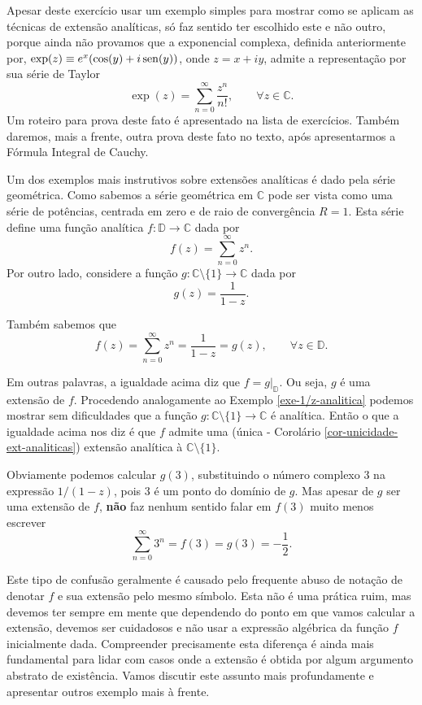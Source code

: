 \begin{exemplo}
\medskip 
\noindent
\begin{observacao}
Apesar deste exercício usar um exemplo simples para
mostrar como se aplicam as técnicas de extensão analíticas, 
só faz sentido ter escolhido este e não outro, 
porque ainda não provamos que a exponencial complexa, definida 
anteriormente por, $\exp(z)\equiv e^{x}(\cos(y)+i\operatorname{sen}(y))$, onde $z=x+iy$,
admite a representação por sua série de Taylor 
\[
\exp(z) = \sum_{n=0}^{\infty} \frac{z^n}{n!}, \qquad \forall z\in\mathbb{C}.
\]
Um roteiro para prova deste fato é apresentado na lista de exercícios. 
Também daremos, mais a frente, outra prova deste fato no texto, após apresentarmos 
a Fórmula Integral de Cauchy.
\end{observacao}
\end{exemplo}







\begin{exemplo}
Um dos exemplos mais instrutivos sobre extensões analíticas é dado pela 
série geométrica. Como sabemos a série geométrica em $\mathbb{C}$ pode ser 
vista como uma série de potências, centrada em zero e de raio de convergência $R=1$.
Esta série define uma função analítica $f:\mathbb{D}\to\mathbb{C}$ dada por 
\[
f(z) = \sum_{n=0}^{\infty} z^n.
\]
Por outro lado, considere a 
função $g:\mathbb{C}\setminus\{1\}\to\mathbb{C}$ dada por
\[
g(z) = \frac{1}{1-z}.
\]

Também sabemos que
\[
f(z) = \sum_{n=0}^{\infty}z^n  = \frac{1}{1-z} = g(z), \qquad \forall z\in\mathbb{D}.
\]

Em outras palavras, a igualdade acima diz que $f=g|_{\mathbb{D}}$. 
Ou seja, $g$ é uma extensão de $f$. Procedendo analogamente ao Exemplo \ref{exe-1/z-analitica} podemos
mostrar sem dificuldades que a função 
$g:\mathbb{C}\setminus\{1\}\to\mathbb{C}$ é analítica. 
Então o que a igualdade acima nos diz é que $f$ admite uma 
(única - Corolário \ref{cor-unicidade-ext-analiticas}) 
extensão analítica à $\mathbb{C}\setminus\{1\}$. 

Obviamente podemos calcular $g(3)$, substituindo o número complexo $3$ na 
expressão $1/(1-z)$, pois $3$ é um ponto do domínio de $g$. 
Mas apesar de $g$ ser uma extensão de $f$, \textbf{não} faz nenhum sentido
falar em $f(3)$ muito menos escrever 
\[
\sum_{n=0}^{\infty} 3^n = f(3) = g(3) = -\frac{1}{2}.
\]

Este tipo de confusão geralmente é causado pelo frequente abuso de notação
de denotar $f$ e sua extensão pelo mesmo símbolo. Esta não é uma prática
ruim, mas devemos ter sempre em mente que dependendo do ponto em que vamos
calcular a extensão, devemos ser cuidadosos e não 
usar a expressão algébrica da função $f$ inicialmente dada.
Compreender precisamente esta diferença é ainda mais fundamental
para lidar com casos onde a extensão é obtida por algum 
argumento abstrato de existência. Vamos discutir este assunto
mais profundamente e apresentar outros exemplo mais à frente.
\end{exemplo}


